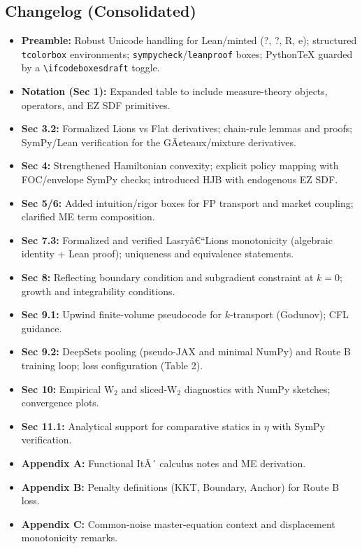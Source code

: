 \documentclass[11pt,letterpaper,oneside]{article}
\numberwithin{equation}{section}
\newcommand{\1}{\mathbf{1}}
\begin{document}
\subsection*{Changelog (Consolidated)}
\begin{itemize}[leftmargin=1.15em,itemsep=0.25em]
  \item \textbf{Preamble:} Robust Unicode handling for Lean/minted (?, ?, R, e); structured \texttt{tcolorbox} environments; \texttt{sympycheck}/\texttt{leanproof} boxes; PythonTeX guarded by a \texttt{\textbackslash ifcodeboxesdraft} toggle.
  \item \textbf{Notation (Sec 1):} Expanded table to include measure-theory objects, operators, and EZ SDF primitives.
  \item \textbf{Sec 3.2:} Formalized Lions vs Flat derivatives; chain-rule lemmas and proofs; SymPy/Lean verification for the GÃ¢teaux/mixture derivatives.
  \item \textbf{Sec 4:} Strengthened Hamiltonian convexity; explicit policy mapping with FOC/envelope SymPy checks; introduced HJB with endogenous EZ SDF.
  \item \textbf{Sec 5/6:} Added intuition/rigor boxes for FP transport and market coupling; clarified ME term composition.
  \item \textbf{Sec 7.3:} Formalized and verified Lasryâ€“Lions monotonicity (algebraic identity + Lean proof); uniqueness and equivalence statements.
  \item \textbf{Sec 8:} Reflecting boundary condition and subgradient constraint at $k=0$; growth and integrability conditions.
  \item \textbf{Sec 9.1:} Upwind finite-volume pseudocode for $k$-transport (Godunov); CFL guidance.
  \item \textbf{Sec 9.2:} DeepSets pooling (pseudo-JAX and minimal NumPy) and Route B training loop; loss configuration (Table 2).
  \item \textbf{Sec 10:} Empirical $\mathrm W_2$ and sliced-$\mathrm W_2$ diagnostics with NumPy sketches; convergence plots.
  \item \textbf{Sec 11.1:} Analytical support for comparative statics in $\eta$ with SymPy verification.
  \item \textbf{Appendix A:} Functional ItÃ´ calculus notes and ME derivation.
  \item \textbf{Appendix B:} Penalty definitions (KKT, Boundary, Anchor) for Route B loss.
  \item \textbf{Appendix C:} Common-noise master-equation context and displacement monotonicity remarks.

\end{itemize}
\end{document}
